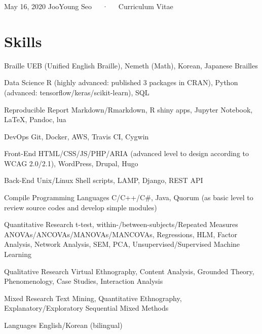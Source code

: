 \documentclass[11pt, a4paper]{awesome-cv}
\begin{document}
\makecvheader

\makecvfooter
  {May 16, 2020}
    {JooYoung Seo~~~·~~~Curriculum Vitae}
  {\thepage}





\hypertarget{skills}{%
\section{Skills}\label{skills}}

\begin{cvskills}
  \cvskill
    {Braille}
    {UEB (Unified English Braille), Nemeth (Math), Korean, Japanese Brailles}

  \cvskill
    {Data Science}
    {R (highly advanced: published 3 packages in CRAN), Python (advanced: tensorflow/keras/scikit-learn), SQL}

  \cvskill
    {Reproducible Report}
    {Markdown/Rmarkdown, R shiny apps, Jupyter Notebook, LaTeX, Pandoc, lua}

  \cvskill
    {DevOps}
    {Git, Docker, AWS, Travis CI, Cygwin}

  \cvskill
    {Front-End}
    {HTML/CSS/JS/PHP/ARIA (advanced level to design according to WCAG 2.0/2.1), WordPress, Drupal, Hugo}

  \cvskill
    {Back-End}
    {Unix/Linux Shell scripts, LAMP, Django, REST API}

  \cvskill
    {Compile Programming Languages}
    {C/C++/C\#, Java, Quorum (as basic level to review source codes and develop simple modules)}

  \cvskill
    {Quantitative Research}
    {t-test, within-/between-subjects/Repeated Measures ANOVAs/ANCOVAs/MANOVAs/MANCOVAs, Regressions, \newline HLM, Factor Analysis, Network Analysis, SEM, PCA, Unsupervised/Supervised Machine Learning}

  \cvskill
    {Qualitative Research}
    {Virtual Ethnography, Content Analysis, Grounded Theory, Phenomenology, Case Studies, Interaction Analysis}

  \cvskill
    {Mixed Research}
    {Text Mining, Quantitative Ethnography, Explanatory/Exploratory Sequential Mixed Methods}

  \cvskill
    {Languages}
    {English/Korean (bilingual)}
\end{cvskills}
\end{document}
